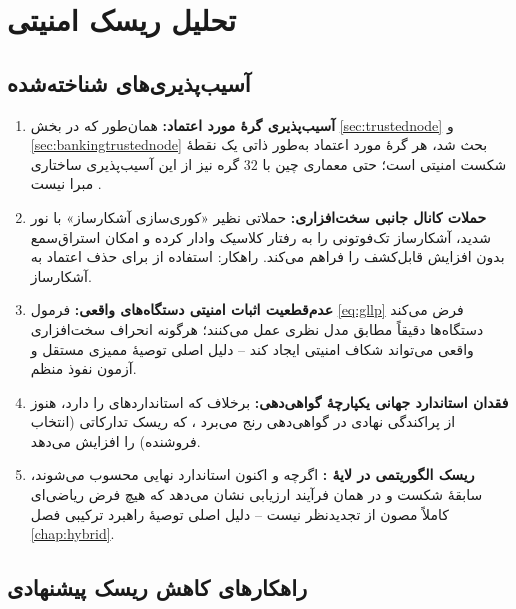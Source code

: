 \chapter{تحلیل ریسک امنیتی}
\label{chap:security}

\section{آسیب‌پذیری‌های شناخته‌شده}

\begin{enumerate}
\item \textbf{آسیب‌پذیری گرهٔ مورد اعتماد:} همان‌طور که در بخش \ref{sec:trustednode} و \ref{sec:bankingtrustednode} بحث شد، هر گرهٔ مورد اعتماد به‌طور ذاتی یک نقطهٔ شکست امنیتی است؛ حتی معماری چین با $32$ گره نیز از این آسیب‌پذیری ساختاری مبرا نیست \Cite{iiss2026governance}.
\item \textbf{حملات کانال جانبی سخت‌افزاری:} حملاتی نظیر «کوری‌سازی آشکارساز»  با نور شدید، آشکارساز تک‌فوتونی را به رفتار کلاسیک وادار کرده و امکان استراق‌سمع بدون افزایش قابل‌کشف  را فراهم می‌کند. راهکار: استفاده از  برای حذف اعتماد به آشکارساز.
\item \textbf{عدم‌قطعیت اثبات امنیتی دستگاه‌های واقعی:} فرمول \ref{eq:gllp} فرض می‌کند دستگاه‌ها دقیقاً مطابق مدل نظری عمل می‌کنند؛ هرگونه انحراف سخت‌افزاری واقعی می‌تواند شکاف امنیتی ایجاد کند -- دلیل اصلی توصیهٔ ممیزی مستقل و آزمون نفوذ منظم.
\item \textbf{فقدان استاندارد جهانی یکپارچهٔ گواهی‌دهی:} برخلاف  که استانداردهای  را دارد،  هنوز از پراکندگی نهادی در گواهی‌دهی رنج می‌برد \Cite{iiss2026governance}، که ریسک تدارکاتی (انتخاب فروشنده) را افزایش می‌دهد.
\item \textbf{ریسک الگوریتمی در لایهٔ :} اگرچه  و  اکنون استاندارد نهایی محسوب می‌شوند، سابقهٔ شکست  و  در همان فرآیند ارزیابی  \Cite{nistir8547} نشان می‌دهد که هیچ فرض ریاضی‌ای کاملاً مصون از تجدیدنظر نیست -- دلیل اصلی توصیهٔ راهبرد ترکیبی فصل \ref{chap:hybrid}.
\end{enumerate}

\section{راهکارهای کاهش ریسک پیشنهادی}

